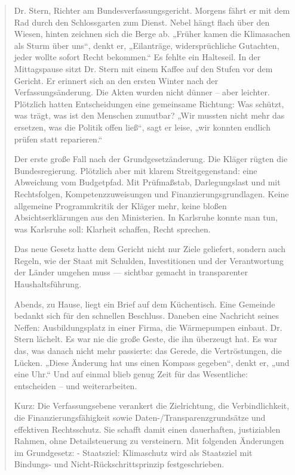 \documentclass[12pt,a4paper]{scrartcl}
\begin{document}
\begin{quote}
Dr. Stern, Richter am Bundesverfassungsgericht. Morgens fährt er mit dem Rad durch den Schlossgarten zum Dienst. Nebel hängt flach über den Wiesen, hinten zeichnen sich die Berge ab. „Früher kamen die Klimasachen als Sturm über uns“, denkt er, „Eilanträge, widersprüchliche Gutachten, jeder wollte sofort Recht bekommen.“ Es fehlte ein Halteseil. In der Mittagspause sitzt Dr. Stern mit einem Kaffee auf den Stufen vor dem Gericht. Er erinnert sich an den ersten Winter nach der Verfassungsänderung. Die Akten wurden nicht dünner -- aber leichter. Plötzlich hatten Entscheidungen eine gemeinsame Richtung: Was schützt, was trägt, was ist den Menschen zumutbar? „Wir mussten nicht mehr das ersetzen, was die Politik offen ließ“, sagt er leise, „wir konnten endlich prüfen statt reparieren.“

 Der erste große Fall nach der Grundgesetzänderung. Die Kläger rügten die Bundesregierung. Plötzlich aber mit klarem Streitgegenstand: eine Abweichung vom Budgetpfad. Mit Prüfmaßstab, Darlegungslast und mit Rechtsfolgen, Kompetenzzuweisungen und Finanzierungsgrundlagen. Keine allgemeine Programmkritik der Kläger mehr, keine bloßen Absichtserklärungen aus den Ministerien. In Karlsruhe konnte man tun, was Karlsruhe soll: Klarheit schaffen, Recht sprechen.

 Das neue Gesetz hatte dem Gericht nicht nur Ziele geliefert, sondern auch Regeln, wie der Staat mit Schulden, Investitionen und der Verantwortung der Länder umgehen muss --- sichtbar gemacht in transparenter Haushaltsführung.

 Abends, zu Hause, liegt ein Brief auf dem Küchentisch. Eine Gemeinde bedankt sich für den schnellen Beschluss. Daneben eine Nachricht seines Neffen: Ausbildungsplatz in einer Firma, die Wärmepumpen einbaut. Dr. Stern lächelt. Es war nie die große Geste, die ihn überzeugt hat. Es war das, was danach nicht mehr passierte: das Gerede, die Vertröstungen, die Lücken. „Diese Änderung hat uns einen Kompass gegeben“, denkt er, „und eine Uhr.“ Und auf einmal blieb genug Zeit für das Wesentliche: entscheiden -- und weiterarbeiten.

Kurz: Die Verfassungsebene verankert die Zielrichtung, die Verbindlichkeit, die Finanzierungsfähigkeit sowie Daten-/Transparenzgrundsätze und effektiven Rechtsschutz. Sie schafft damit einen dauerhaften, justiziablen Rahmen, ohne Detailsteuerung zu versteinern. Mit folgenden Änderungen im Grundgesetz:
- Staatsziel: Klimaschutz wird als Staatsziel mit Bindungs- und Nicht-Rückschrittsprinzip festgeschrieben.


\end{quote}
\end{document}
